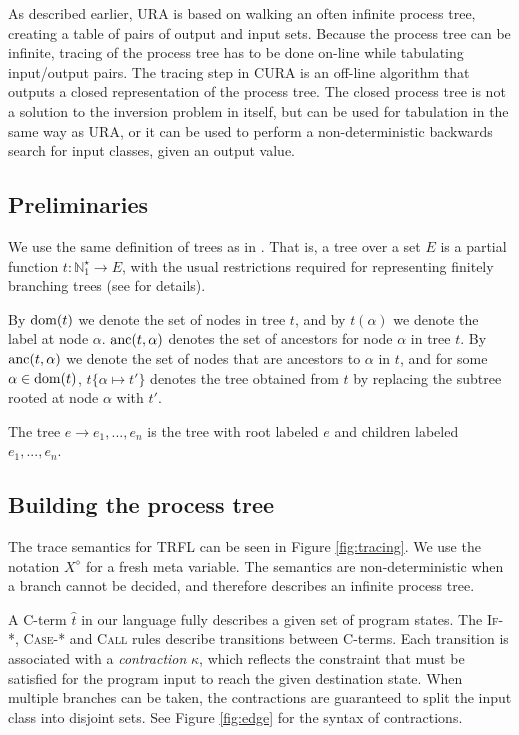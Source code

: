 \documentclass[10pt]{../sigplanconf}
\newcommand{\dom}{\ensuremath{{\rm dom}}}
\newcommand{\anc}{\ensuremath{{\rm anc}}}
\begin{document}
As described earlier, URA is based on walking an often infinite
process tree, creating a table of pairs of output and input
sets. Because the process tree can be infinite, tracing of the process
tree has to be done on-line while tabulating input/output pairs. The
tracing step in CURA is an off-line algorithm that outputs a closed
representation of the process tree. The closed process tree is not a
solution to the inversion problem in itself, but can be used for
tabulation in the same way as URA, or it can be used to perform a
non-deterministic backwards search for input classes, given an output
value.

\subsection{Preliminaries}
We use the same definition of trees as in
\cite{sorensen1998introduction}. That is, a tree over a set $E$ is a
partial function $t : \mathbb{N}_1^\star \rightarrow E$, with the
usual restrictions required for representing finitely branching trees
(see \cite{sorensen1998introduction}\cite{courcelle1983fundamental}
for details).

By $\dom(t)$ we denote the set of nodes in tree $t$, and by
$t(\alpha)$ we denote the label at node $\alpha$. ${\rm anc}(t,
\alpha)$ denotes the set of ancestors for node $\alpha$ in tree
$t$. By $\anc(t, \alpha)$ we denote the set of nodes that are
ancestors to $\alpha$ in $t$, and for some $\alpha \in \dom(t)$,
$t\{\alpha \mapsto t'\}$ denotes the tree obtained from $t$ by replacing
the subtree rooted at node $\alpha$ with $t'$.

The tree $e \rightarrow e_1, ..., e_n$ is the tree with root labeled
$e$ and children labeled $e_1, ..., e_n$.

\subsection{Building the process tree}
The trace semantics for TRFL can be seen in Figure
\ref{fig:tracing}. We use the notation $X^\diamond$ for a fresh meta
variable. The semantics are non-deterministic when a branch cannot be
decided, and therefore describes an infinite process tree.

A C-term $\widehat{t}$ in our language fully describes a given set of
program states. The \textsc{If-*}, \textsc{Case-*} and \textsc{Call}
rules describe transitions between C-terms. Each transition is
associated with a \emph{contraction} $\kappa$, which reflects the
constraint that must be satisfied for the program input to reach the
given destination state. When multiple branches can be taken, the
contractions are guaranteed to split the input class into disjoint
sets. See Figure \ref{fig:edge} for the syntax of contractions.
\end{document}
